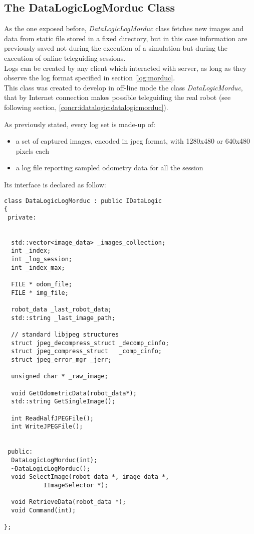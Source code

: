 \subsection{The DataLogicLogMorduc Class}
\label{concr:idatalogic:datalogiclogmorduc}

As the one exposed before, \textit{DataLogicLogMorduc} class
fetches new images and data from static file
stored in a fixed directory, but in this case information are previously saved
not during the execution of a simulation but during
the execution of online teleguiding sessions.
\\
Logs can be created by any client which interacted with \morduc{}
server, as long as they observe the log format specified in section
\ref{log:morduc}.
\\
This class was created to develop in off-line mode the class
\textit{DataLogicMorduc}, that by Internet connection makes possible
teleguiding the real robot (see following section,
\ref{concr:idatalogic:datalogicmorduc}).

As previously stated, every log set is made-up of:

\begin{itemize}
  \item a set of captured images, encoded in jpeg format,
    with 1280x480 or 640x480 pixels each
  \item a log file reporting sampled odometry data
    for all the session
\end{itemize}

Its interface is declared as follow:
\\
\begin{lstlisting}[caption={\texttt{DataLogicLogMorduc} declaration},
    label={code:datalogiclogmorduc:constructor}]
class DataLogicLogMorduc : public IDataLogic
{
 private:

  
  std::vector<image_data> _images_collection;
  int _index;
  int _log_session;
  int _index_max;

  FILE * odom_file;
  FILE * img_file;

  robot_data _last_robot_data;
  std::string _last_image_path;

  // standard libjpeg structures
  struct jpeg_decompress_struct _decomp_cinfo;
  struct jpeg_compress_struct   _comp_cinfo;
  struct jpeg_error_mgr _jerr;

  unsigned char * _raw_image;
 
  void GetOdometricData(robot_data*);
  std::string GetSingleImage();

  int ReadHalfJPEGFile();
  int WriteJPEGFile();

  
 public:
  DataLogicLogMorduc(int);
  ~DataLogicLogMorduc();
  void SelectImage(robot_data *, image_data *,
		   IImageSelector *);

  void RetrieveData(robot_data *);
  void Command(int);

};
\end{lstlisting}

